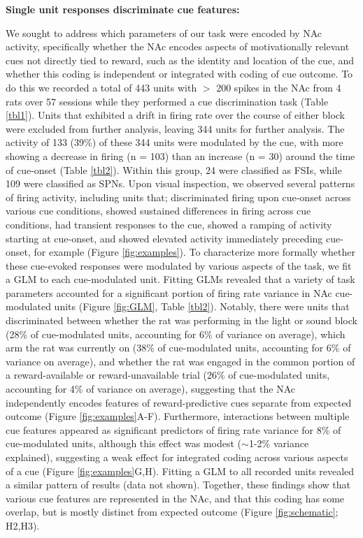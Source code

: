 \documentclass[11pt]{article}
\begin{document}
{\bf Single unit responses discriminate cue features:}

We sought to address which parameters of our task were encoded by NAc activity, specifically whether the NAc encodes aspects of motivationally relevant cues not directly tied to reward, such as the identity and location of the cue, and whether this coding is independent or integrated with coding of cue outcome. To do this we recorded a total of 443 units with $>$ 200 spikes in the NAc from 4 rats over 57 sessions while they performed a cue discrimination task (Table \ref{tbl1}). Units that exhibited a drift in firing rate over the course of either block were excluded from further analysis, leaving 344 units for further analysis. The activity of 133 (39\%) of these 344 units were modulated by the cue, with more showing a decrease in firing (n =  103) than an increase (n = 30) around the time of cue-onset (Table \ref{tbl2}). Within this group, 24 were classified as FSIs, while 109 were classified as SPNs. Upon visual inspection, we observed several patterns of firing activity, including units that; discriminated firing upon cue-onset across various cue conditions, showed sustained differences in firing across cue conditions, had transient responses to the cue, showed a ramping of activity starting at cue-onset, and showed elevated activity immediately preceding cue-onset, for example (Figure \ref{fig:examples}). To characterize more formally whether these cue-evoked responses were modulated by various aspects of the task, we fit a GLM to each cue-modulated unit. Fitting GLMs revealed that a variety of task parameters accounted for a significant portion of firing rate variance in NAc cue-modulated units (Figure \ref{fig:GLM}, Table \ref{tbl2}). Notably, there were units that discriminated between whether the rat was performing in the light or sound block (28\% of cue-modulated units, accounting for 6\% of variance on average), which arm the rat was currently on (38\% of cue-modulated units, accounting for 6\% of variance on average), and whether the rat was engaged in the common portion of a reward-available or reward-unavailable trial (26\% of cue-modulated units, accounting for 4\% of variance on average), suggesting that the NAc independently encodes features of reward-predictive cues separate from expected outcome (Figure \ref{fig:examples}A-F). Furthermore, interactions between multiple cue features appeared as significant predictors of firing rate variance for 8\% of cue-modulated units, although this effect was modest ($\sim$1-2\% variance explained), suggesting a weak effect for integrated coding across various aspects of a cue (Figure \ref{fig:examples}G,H). Fitting a GLM to all recorded units revealed a similar pattern of results (data not shown). Together, these findings show that various cue features are represented in the NAc, and that this coding has some overlap, but is mostly distinct from expected outcome (Figure \ref{fig:schematic}; H2,H3).
\end{document}
